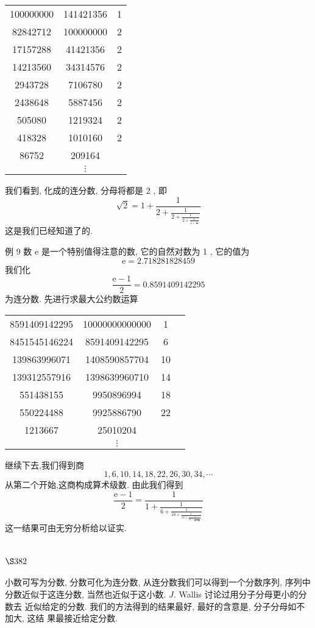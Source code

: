 \begin{tabular}{c|c|l}
100000000 & 141421356 & 1 \\
82842712 & 100000000 & 2 \\
\hline 17157288 & 41421356 & 2 \\
14213560 & 34314576 & 2 \\
\hline 2943728 & 7106780 & 2 \\
2438648 & 5887456 & 2 \\
\hline 505080 & 1219324 & 2 \\
418328 & 1010160 & 2 \\
\hline 86752 & 209164 & \\
\hline & $\vdots$ &
\end{tabular}

我们看到, 化成的连分数, 分母将都是 2 , 即
\[
\sqrt{2}=1+\frac{1}{2+\frac{1}{2+\frac{1}{2+\frac{1}{2+\frac{1}{\cdots}}}}}
\]
这是我们已经知道了的.

例 9 数 $\mathrm{e}$ 是一个特别值得注意的数, 它的自然对数为 1 , 它的值为
\[
\mathrm{e}=2.718281828459
\]
我们化
\[
\frac{\mathrm{e}-1}{2}=0.8591409142295
\]
为连分数. 先进行求最大公约数运算

\begin{tabular}{c|c|c|c}
8591409142295 & 10000000000000 & 1 \\
8451545146224 & 8591409142295 & 6 \\
\cline { 1 - 3 } 139863996071 & 1408590857704 & 10 \\
139312557916 & 1398639960710 & 14 \\
\cline { 1 - 3 } 551438155 & 9950896994 & 18 \\
550224488 & 9925886790 & 22 \\
\hline 1213667 & 25010204 & \multicolumn{1}{|c}{} \\
\cline { 1 - 3 } & $\vdots$
\end{tabular}

继续下去,我们得到商
\[
1,6,10,14,18,22,26,30,34, \cdots
\]
从第二个开始,这商构成算术级数. 由此我们得到
\[
\frac{\mathrm{e}-1}{2}=\frac{1}{1+\frac{1}{6+\frac{1}{10+\frac{1}{14+\frac{1}{18+\frac{1}{22+\frac{1}{\cdots}}}}}}}
\]
这一结果可由无穷分析给以证实.

\section{$\S 382$}

小数可写为分数, 分数可化为连分数, 从连分数我们可以得到一个分数序列, 序列中 分数近似于这连分数, 当然也近似于这小数. $J$. Wallis 讨论过用分子分母更小的分数去 近似给定的分数. 我们的方法得到的结果最好, 最好的含意是, 分子分母如不加大, 这结 果最接近给定分数.

